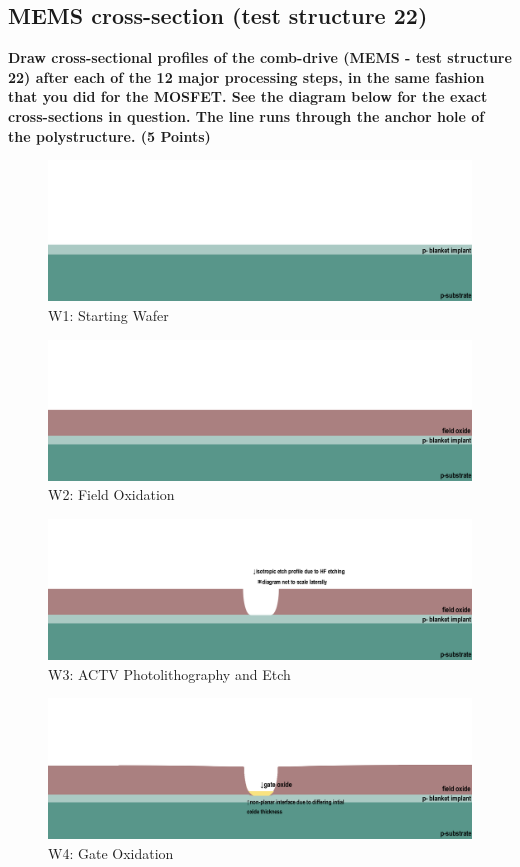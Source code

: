 \documentclass{article}
\begin{document}
\subsection{MEMS cross-section (test structure 22)}
\textbf{Draw cross-sectional profiles of the comb-drive (MEMS - test structure 22) after
each of the 12 major processing steps, in the same fashion that you did for the
MOSFET. See the diagram below for the exact cross-sections in question. The line
runs through the anchor hole of the polystructure. (5 Points)}
\begin{figure}[H]
\centering
\includegraphics[width=350pt]{CrossSections/MEMSlabprofiles/MEMSw1.png}
\caption{W1: Starting Wafer}
\end{figure}
\begin{figure}[H]
\centering
\includegraphics[width=350pt]{CrossSections/MEMSlabprofiles/MEMSw2.png}
\caption{W2: Field Oxidation}
\end{figure}
\begin{figure}[H]
\centering
\includegraphics[width=350pt]{CrossSections_Updates/MEMSw3_note.png}
\caption{W3: ACTV Photolithography and Etch}
\end{figure}
\begin{figure}[H]
\centering
\includegraphics[width=350pt]{CrossSections_Updates/MEMSw4_note.png}
\caption{W4: Gate Oxidation}
\end{figure}
\end{document}
